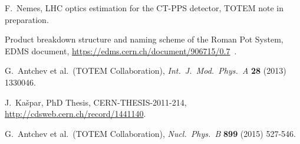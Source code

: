 \documentclass[TOTEM]{cern/cernphprep}
\def\etal{et al.}
\def\Name#1{#1, }
\def\Review#1#2#3#4{{\it #1} {\bf #2} (#3) #4}
\begin{document}

\begin{thebibliography}{99}

	\Name{F.~Nemes}
	LHC optics estimation for the CT-PPS detector, TOTEM note in preparation.

	Product breakdown structure and naming scheme of the Roman Pot System, EDMS document,
	\url{https://edms.cern.ch/document/906715/0.7}\ .

	\Name{G.~Antchev \etal{}~(TOTEM Collaboration)}
	\Review{Int.~J.~Mod.~Phys.~A}{28}{2013}{1330046}.

	\Name{J.~Ka\v spar}
	PhD Thesis, CERN-THESIS-2011-214,\hfil\break
	\url{http://cdsweb.cern.ch/record/1441140}.

	\Name{G.~Antchev \etal{}~(TOTEM Collaboration)}
	\Review{Nucl.~Phys.~B}{899}{2015}{527-546}.

\end{thebibliography}
\end{document}
